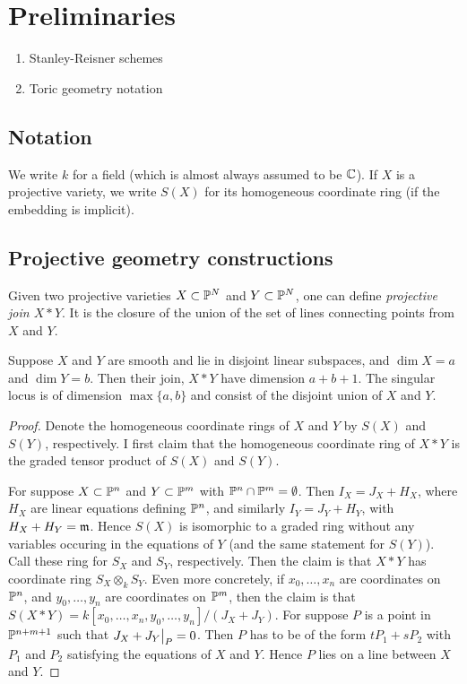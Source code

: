 \chapter{Preliminaries}
\label{sec:prelims}

\begin{enumerate}
	\item Stanley-Reisner schemes
	\item Toric geometry notation
\end{enumerate}
\section{Notation}

We write $k$ for a field (which is almost always assumed to be $\C$). If $X$ is a projective variety, we write $S(X)$ for its homogeneous coordinate ring (if the embedding is implicit). 

\section{Projective geometry constructions}

Given two projective varieties $X \subset \P^N$ and $Y \subset \P^N$, one can define \emph{projective join $X \ast Y$}. It is the closure of the union of the set of lines connecting points from $X$ and $Y$.

\begin{lemma}
\label{lemma:join}
Suppose $X$ and $Y$ are smooth and lie in disjoint linear subspaces, and $\dim X=a$ and $\dim Y=b$. Then their join, $X \ast Y$ have dimension $a+b+1$. The singular locus is of dimension $\max\{a,b\}$ and consist of the disjoint union of $X$ and $Y$.
\end{lemma}
\begin{proof}
Denote the homogeneous coordinate rings of $X$ and $Y$ by $S(X)$ and $S(Y)$, respectively. I first claim that the homogeneous coordinate ring of $X \ast Y$ is the graded tensor product of $S(X)$ and $S(Y)$. 

For suppose $X \subset \P^n$ and $Y \subset \P^m$ with $\P^n \cap \P^m = \emptyset$. Then $I_X=J_X+H_X$, where $H_X$ are linear equations defining $\P^n$, and similarly $I_Y = J_Y+H_Y$, with $H_X + H_Y=\mm$. Hence $S(X)$ is isomorphic to a graded ring without any variables occuring in the equations of $Y$ (and the same statement for $S(Y)$). Call these ring for $S_X$ and $S_Y$, respectively. Then the claim is that $X \ast Y$ has coordinate ring $S_X \otimes_k S_Y$. Even more concretely, if $x_0,\ldots,x_n$ are coordinates on $\P^n$, and $y_0,\ldots,y_n$ are coordinates on $\P^m$, then the claim is that $S(X \ast Y)=k[x_0,\ldots,x_n,y_0,\ldots,y_n]/(J_X+J_Y)$. For suppose $P$ is a point in $\P^{n+m+1}$ such that $\restr{J_X+J_Y}{P}=0$. Then $P$ has to be of the form $tP_1 + sP_2$ with $P_1$ and $P_2$ satisfying the equations of $X$ and $Y$. Hence $P$ lies on a line between $X$ and $Y$.

\end{proof}

